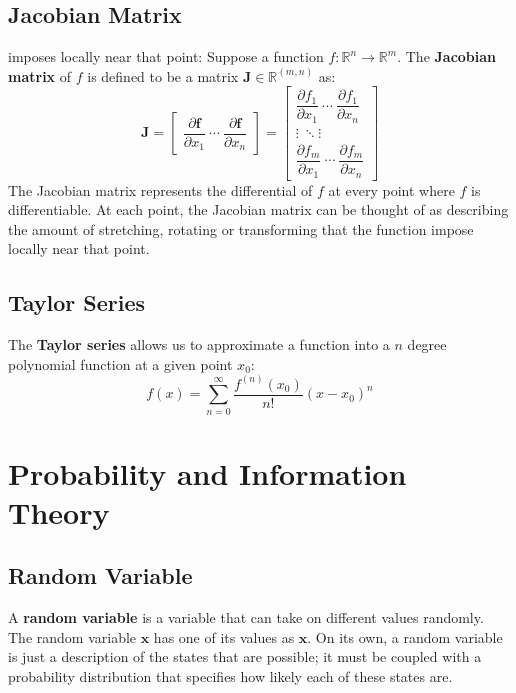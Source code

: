 \documentclass[12pt]{report}
\begin{document}
    \section{Jacobian Matrix} imposes locally near that point:
    Suppose a function $f:\mathbb{R}^n \rightarrow \mathbb{R}^m$. The \textbf{Jacobian matrix} of $f$ is defined to be a matrix $\boldsymbol{J} \in \mathbb{R}^(m,n)$ as:
    \begin{equation}
        \displaystyle \mathbf {J} ={\begin{bmatrix}{\dfrac {\partial \mathbf {f} }{\partial x_{1}}}~\cdots~{\dfrac {\partial \mathbf {f} }{\partial x_{n}}}\end{bmatrix}}={\begin{bmatrix}{\dfrac {\partial f_{1}}{\partial x_{1}}}~\cdots~{\dfrac {\partial f_{1}}{\partial x_{n}}}\\\vdots~\ddots\vdots~\\{\dfrac {\partial f_{m}}{\partial x_{1}}}~\cdots~{\dfrac {\partial f_{m}}{\partial x_{n}}}\end{bmatrix}}
    \end{equation}
     The Jacobian matrix represents the differential of $f$ at every point where $f$ is differentiable. At each point, the Jacobian matrix can be thought of as describing the amount of stretching, rotating or transforming that the function impose locally near that point.
     
    \section{Taylor Series}
    The \textbf{Taylor series} allows us to approximate a function into a $n$ degree polynomial function at a given point $x_0$:
    \begin{equation}
        f(x) = \sum_{n = 0}^{\infty}{\frac{f^{(n)}(x_0)}{n!}(x - x_0)^n}
    \end{equation}
\chapter{Probability and Information Theory}
    \section{Random Variable}
    A \textbf{random variable} is a variable that can take on different values randomly.
    The random variable $\mathbf{x}$ has one of its values as $\boldsymbol{x}$. On its own, a random variable is just a description of the states that are possible; it must be coupled with a probability distribution that specifies how likely each of these states are.
\end{document}
